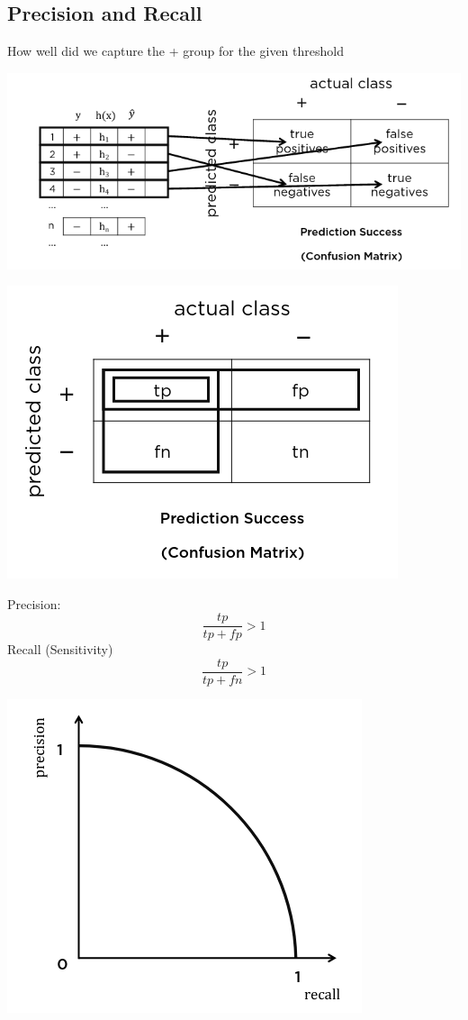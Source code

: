 \documentclass{article}[18pt]
\begin{document}
\subsection{Precision and Recall}
How well did we capture the + group for the given threshold
\begin{center}
	\includegraphics[scale=0.7]{"Precision and Recall"}
\end{center}
\begin{center}
	\includegraphics[scale=0.7]{"Precision and Recall1"}
\end{center}
Precision:
$$\dfrac{tp}{tp+fp}>1$$
Recall (Sensitivity)
$$\dfrac{tp}{tp+fn}>1$$
\begin{center}
	\includegraphics[scale=0.7]{"Precision and Recall2"}
\end{center}
\end{document}
